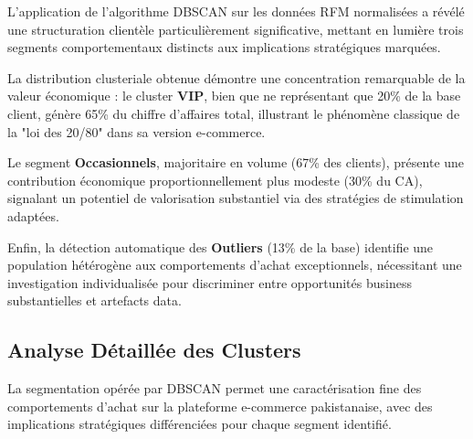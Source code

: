 \documentclass[a4paper,12pt]{article}
\begin{document}
L'application de l'algorithme DBSCAN sur les données RFM normalisées a révélé une structuration clientèle particulièrement significative, mettant en lumière trois segments comportementaux distincts aux implications stratégiques marquées. 

La distribution clusteriale obtenue démontre une concentration remarquable de la valeur économique : le cluster \textbf{VIP}, bien que ne représentant que 20\% de la base client, génère 65\% du chiffre d'affaires total, illustrant le phénomène classique de la "loi des 20/80" dans sa version e-commerce. 

Le segment \textbf{Occasionnels}, majoritaire en volume (67\% des clients), présente une contribution économique proportionnellement plus modeste (30\% du CA), signalant un potentiel de valorisation substantiel via des stratégies de stimulation adaptées. 

Enfin, la détection automatique des \textbf{Outliers} (13\% de la base) identifie une population hétérogène aux comportements d'achat exceptionnels, nécessitant une investigation individualisée pour discriminer entre opportunités business substantielles et artefacts data.

\subsection{Analyse Détaillée des Clusters}

La segmentation opérée par DBSCAN permet une caractérisation fine des comportements d'achat sur la plateforme e-commerce pakistanaise, avec des implications stratégiques différenciées pour chaque segment identifié.
\end{document}
